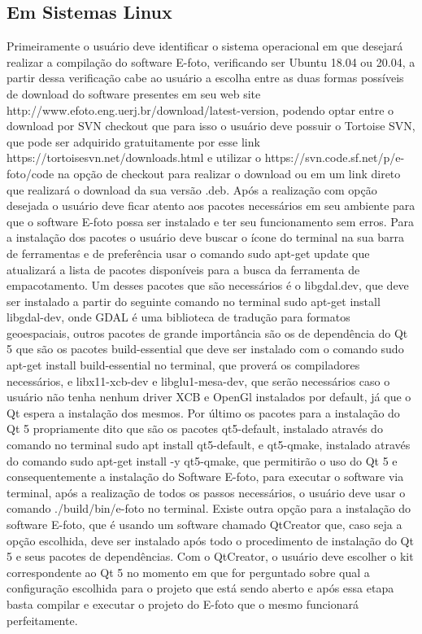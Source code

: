 \subsection{Em Sistemas Linux}

Primeiramente o usuário deve identificar o sistema operacional em que desejará realizar a compilação do software E-foto, verificando ser Ubuntu 18.04 ou 20.04, a partir dessa verificação cabe ao usuário a escolha entre as duas formas possíveis de download do software presentes em seu web site http://www.efoto.eng.uerj.br/download/latest-version, podendo optar entre o download por SVN checkout que para isso o usuário deve possuir o Tortoise SVN, que pode ser adquirido gratuitamente por esse link https://tortoisesvn.net/downloads.html e utilizar o https://svn.code.sf.net/p/e-foto/code na opção de checkout para realizar o download ou em um link direto que realizará o download da sua versão .deb. Após a realização com opção desejada o usuário deve ficar atento aos pacotes necessários em seu ambiente para que o software E-foto possa ser instalado e ter seu funcionamento sem erros. Para a instalação dos pacotes o usuário deve buscar o ícone do terminal na sua barra de ferramentas e de preferência usar o comando sudo apt-get update que atualizará a lista de pacotes disponíveis para a busca da ferramenta de empacotamento. Um desses pacotes que são necessários é o libgdal.dev, que deve ser instalado a partir do seguinte comando no  terminal sudo apt-get install libgdal-dev, onde GDAL é uma biblioteca de tradução para formatos geoespaciais, outros pacotes de grande importância são os de dependência do Qt 5 que são os pacotes build-essential que deve ser instalado com o comando sudo apt-get install build-essential no terminal, que proverá os compiladores necessários, e libx11-xcb-dev e libglu1-mesa-dev, que serão necessários caso o usuário não tenha nenhum driver XCB e OpenGl instalados por default, já que o Qt espera a instalação dos mesmos. Por último os pacotes para a instalação do Qt 5 propriamente dito que são os pacotes qt5-default, instalado através do comando no terminal sudo apt install qt5-default, e qt5-qmake, instalado através do comando sudo apt-get install -y qt5-qmake, que permitirão o uso do Qt 5 e consequentemente a instalação do Software E-foto, para executar o software via terminal, após a realização de todos os passos necessários, o usuário deve usar o comando ./build/bin/e-foto no terminal. Existe outra opção para a instalação do software E-foto, que é usando um software chamado QtCreator que, caso seja a opção escolhida, deve ser instalado após todo o procedimento de instalação do Qt 5 e seus pacotes de dependências. Com o QtCreator, o usuário deve escolher o kit correspondente ao Qt 5 no momento em que for perguntado sobre qual a configuração escolhida para o projeto que está sendo aberto e após essa etapa basta compilar e executar o projeto do E-foto que o mesmo funcionará perfeitamente.
